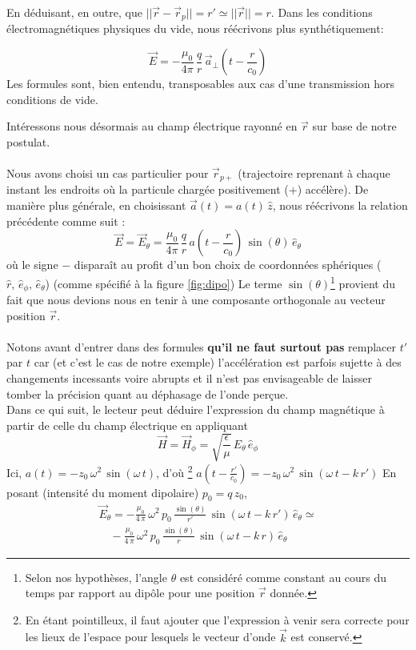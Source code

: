 En déduisant, en outre, que $||\vec{r} - \vec{r}_p|| = r' \simeq ||\vec{r}|| = r$. Dans les conditions électromagnétiques physiques du vide, nous réécrivons plus synthétiquement: 

$$ \vec{E} = -\frac{\mu_0}{4\pi} \,\frac{q}{r}\,\vec{a}_{\perp}(t-\frac{r}{c_0})$$
Les formules sont, bien entendu, transposables aux cas d'une transmission hors conditions de vide.

Intéressons nous désormais au champ électrique rayonné en $\vec{r}$ sur base de notre postulat. \\ \\Nous avons choisi un cas particulier pour $\vec{r}_{p+}$ (trajectoire reprenant à chaque instant les endroits où la particule chargée positivement (+) accélère). De manière plus générale, en choisissant $\vec{a}(t) = a(t)\,\hat{z}$, nous réécrivons la relation précédente comme suit : 
$$ \vec{E} = \vec{E}_{\theta} = \frac{\mu_0}{4\pi} \,\frac{q}{r}\,a(t-\frac{r}{c_0}) \, \sin(\theta)\,\hat{e}_{\theta}$$ où le signe $-$ disparaît au profit d'un bon choix de coordonnées sphériques ($\hat{r},\,\hat{e}_{\phi},\,\hat{e}_{\theta}$) (comme spécifié à la figure \ref{fig:dipo}) Le terme $\sin(\theta)$\footnote{Selon nos hypothèses, l'angle $\theta$ est considéré comme constant au cours du temps par rapport au dipôle pour une position $\vec{r}$ donnée.} provient du fait que nous devions nous en tenir à une composante orthogonale au vecteur position $\vec{r}$.\\ \\
Notons avant d'entrer dans des formules \textbf{qu'il ne faut surtout pas} remplacer $t'$ par $t$ car (et c'est le cas de notre exemple) l'accélération est parfois sujette à des changements incessants voire abrupts et il n'est pas envisageable de laisser tomber la précision quant au déphasage de l'onde perçue. \\
Dans ce qui suit, le lecteur peut déduire l'expression du champ magnétique à partir de celle du champ électrique en appliquant $$\vec{H} = \vec{H}_{\phi} = \sqrt{\frac{\epsilon}{\mu}} \, E_{\theta} \, \hat{e}_{\phi}$$
Ici, $a(t) = -z_{0}\,\omega^2\,\sin(\omega\,t)$, d'où \footnote{En étant pointilleux, il faut ajouter que l'expression à venir sera correcte pour les lieux de l'espace pour lesquels le vecteur d'onde $\vec{k}$ est conservé.}  $ a(t-\frac{r'}{c_0}) = -z_0\,\omega^2\,\sin(\omega\,t - k\,r') $
En posant (intensité du moment dipolaire) $p_0 = q\,z_0$, \begin{multline*} \vec{E}_{\theta} = -\frac{\mu_0}{4\,\pi}\,\omega^2\,p_0\,\frac{\sin(\theta)}{r'}\,\sin(\omega\,t - k\,r')\,\hat{e}_{\theta}\simeq \\ \quad -\frac{\mu_0}{4\,\pi}\,\omega^2\,p_0\,\frac{\sin(\theta)}{r}\,\sin(\omega\,t - k\,r)\,\hat{e}_{\theta}\end{multline*}

